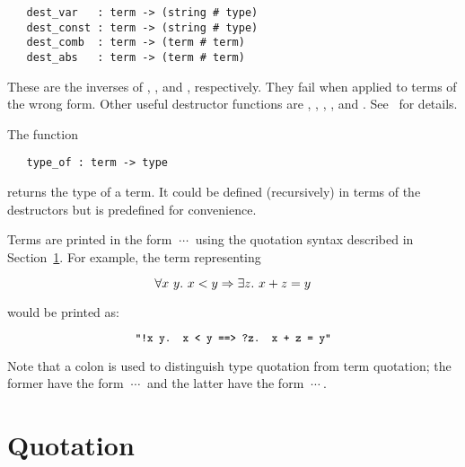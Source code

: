 \begin{boxed}

\begin{verbatim}
   dest_var   : term -> (string # type)
   dest_const : term -> (string # type)
   dest_comb  : term -> (term # term)
   dest_abs   : term -> (term # term)
\end{verbatim}\end{boxed}

These are the inverses of , ,
 and , respectively. They fail when applied
to terms of the wrong form. Other useful destructor functions are
,
,
,
,
 and
.
See \REFERENCE\ for details.

The function

\begin{boxed}
\begin{verbatim}
   type_of : term -> type
\end{verbatim}\end{boxed}

\noindent returns the type of a term. It could be defined (recursively)
in terms of the
destructors but is predefined for convenience.

Terms are printed in the form $\ \cdots\ $
using the quotation syntax described in Section~\ref{quotation}.
For example, the term representing 

\[ \forall x\ y.\ x<y \Rightarrow\exists z.\ x+z = y \]

\noindent would be printed as:

\[ \ml{"!x y. x < y ==> ?z. x + z = y"} \]

Note that a colon
 is used to distinguish type quotation from term quotation;
the former have the form $\ \cdots\ $ and the latter have
 the form $\ \cdots\ $.


\section{Quotation}
\label{quotation}\label{gen-abs}\label{let}

